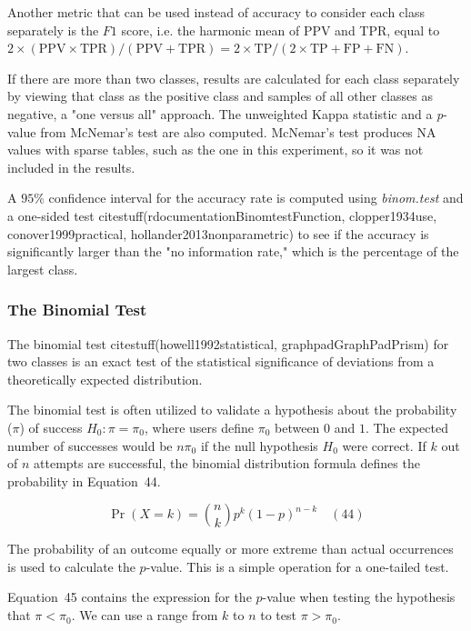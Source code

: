 \documentclass[preprint,12pt]{elsarticle}
\begin{document}
Another metric that can be used instead of accuracy to consider each class separately is the $F1$ score, i.e. the harmonic mean of PPV and TPR, equal to $2 \times (\mathrm{PPV} \times \mathrm{TPR}) / (\mathrm{PPV} + \mathrm{TPR}) = 2 \times \mathrm{TP} / (2 \times \mathrm{TP} + \mathrm{FP} + \mathrm{FN})$.

If there are more than two classes, results are calculated for each class separately by viewing that class as the positive class and samples of all other classes as negative, a "one versus all" approach.
The unweighted Kappa statistic and a \textit{p}-value from McNemar's test are also computed. McNemar's test produces NA values with sparse tables, such as the one in this experiment, so it was not included in the results.

A $95\%$ confidence interval for the accuracy rate is computed using \textit{binom.test} and a one-sided test citestuff(rdocumentationBinomtestFunction, clopper1934use, conover1999practical, hollander2013nonparametric) to see if the accuracy is significantly larger than the "no information rate," which is the percentage of the largest class.

\subsubsection{The Binomial Test}

The binomial test citestuff(howell1992statistical, graphpadGraphPadPrism) for two classes is an exact test of the statistical significance of deviations from a theoretically expected distribution.

The binomial test is often utilized to validate a hypothesis about the probability ($\pi$) of success 
$H_{0}\colon \pi =\pi_{0}$, where users define $\pi_{0}$ between $0$ and $1$. The expected number of successes would be $n\pi_{0}$ if the null hypothesis $H_{0}$ were correct. If $k$ out of $n$ attempts are successful, the binomial distribution formula defines the probability in Equation~44.

\begin{equation}
	\Pr(X=k)={\binom{n}{k}}p^{k}(1-p)^{n-k}
	\quad\left(44\right)
\end{equation}

The probability of an outcome equally or more extreme than actual occurrences is used to calculate the $p$-value. This is a simple operation for a one-tailed test. 

Equation~45 contains the expression for the $p$-value when testing the hypothesis that $\pi <\pi_{0}$. We can use a range from $k$ to $n$ to test $\pi >\pi_{0}$.
\end{document}
